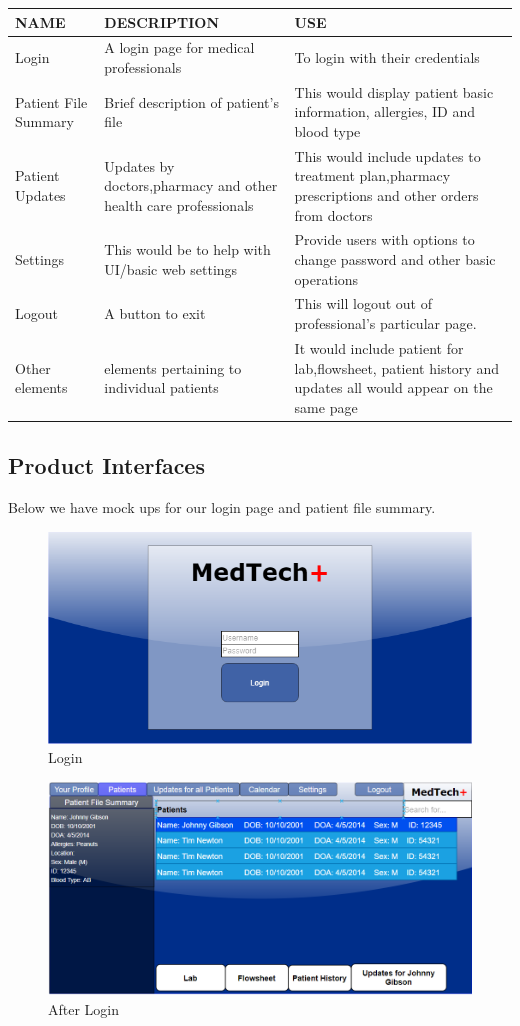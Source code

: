 \begin{tabular}{| p{1in} | >{\centering\arraybackslash} p{2in} | >{\centering\arraybackslash} p{2in} |}
\hline
NAME & DESCRIPTION & USE \\ \hline
Login & A login page for medical professionals & To login with their credentials  \\ \hline
Patient File Summary & Brief description of patient's file & This would display patient basic information, allergies, ID and blood type \\ \hline
Patient Updates & Updates by doctors,pharmacy and other health care professionals  & This would include updates to treatment plan,pharmacy prescriptions and other orders from doctors \\ \hline
Settings & This would be to help with UI/basic web settings & Provide users with options to change password and other basic operations \\ \hline
Logout & A button to exit  & This will logout out of professional's particular page. \\ \hline
Other elements & elements pertaining to individual patients & It would include patient for lab,flowsheet, patient history and updates all would appear on the same page \\ \hline

\end{tabular}
\pagebreak

\subsection{Product Interfaces}
Below we have mock ups for our login page and patient file summary. 

\begin{figure}[h!]
	\centering
   	\includegraphics[width=1.00\textwidth]{images/Login.png}
    \caption{Login}
\end{figure}

\begin{figure}[h!]
	\centering
   	\includegraphics[width=1.00\textwidth]{images/afterlogin.PNG}
    \caption{After Login}
\end{figure}